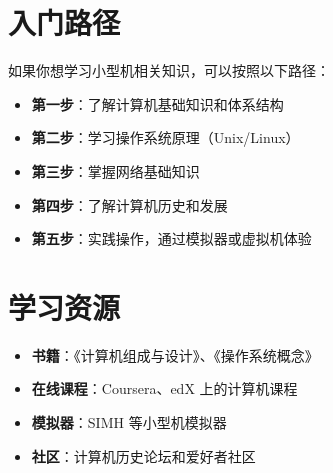 \documentclass[12pt,UTF8]{ctexbook}
\begin{document}
\section{入门路径}

如果你想学习小型机相关知识，可以按照以下路径：

\begin{itemize}[leftmargin=2cm]
    \item \textbf{第一步}：了解计算机基础知识和体系结构
    \item \textbf{第二步}：学习操作系统原理（Unix/Linux）
    \item \textbf{第三步}：掌握网络基础知识
    \item \textbf{第四步}：了解计算机历史和发展
    \item \textbf{第五步}：实践操作，通过模拟器或虚拟机体验
\end{itemize}

\section{学习资源}

\begin{itemize}[leftmargin=2cm]
    \item \textbf{书籍}：《计算机组成与设计》、《操作系统概念》
    \item \textbf{在线课程}：Coursera、edX 上的计算机课程
    \item \textbf{模拟器}：SIMH 等小型机模拟器
    \item \textbf{社区}：计算机历史论坛和爱好者社区
\end{itemize}

\backmatter
\end{document}
